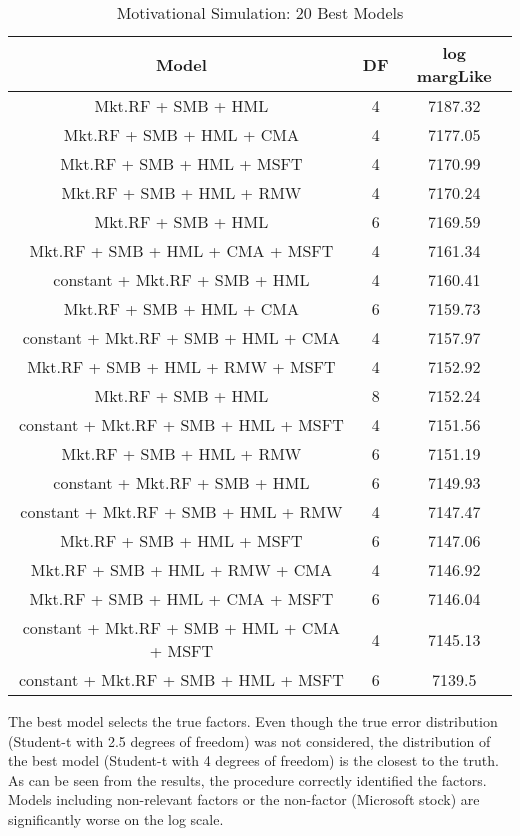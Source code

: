 \begin{table}[ht]
	
	\centering
	\footnotesize
	\begin{tabular}{ccc}
		\hline
		Model & DF & log margLike \\ 
		\hline
Mkt.RF + SMB + HML & 4 & 7187.32 \\ 
Mkt.RF + SMB + HML + CMA & 4 & 7177.05 \\ 
Mkt.RF + SMB + HML + MSFT & 4 & 7170.99 \\ 
Mkt.RF + SMB + HML + RMW & 4 & 7170.24 \\ 
Mkt.RF + SMB + HML & 6 & 7169.59 \\ 
Mkt.RF + SMB + HML + CMA + MSFT & 4 & 7161.34 \\ 
constant + Mkt.RF + SMB + HML & 4 & 7160.41 \\ 
Mkt.RF + SMB + HML + CMA & 6 & 7159.73 \\ 
constant + Mkt.RF + SMB + HML + CMA & 4 & 7157.97 \\ 
Mkt.RF + SMB + HML + RMW + MSFT & 4 & 7152.92 \\ 
Mkt.RF + SMB + HML & 8 & 7152.24 \\ 
constant + Mkt.RF + SMB + HML + MSFT & 4 & 7151.56 \\ 
Mkt.RF + SMB + HML + RMW & 6 & 7151.19 \\ 
constant + Mkt.RF + SMB + HML & 6 & 7149.93 \\ 
constant + Mkt.RF + SMB + HML + RMW & 4 & 7147.47 \\ 
Mkt.RF + SMB + HML + MSFT & 6 & 7147.06 \\ 
Mkt.RF + SMB + HML + RMW + CMA & 4 & 7146.92 \\ 
Mkt.RF + SMB + HML + CMA + MSFT & 6 & 7146.04 \\ 
constant + Mkt.RF + SMB + HML + CMA + MSFT & 4 & 7145.13 \\ 
constant + Mkt.RF + SMB + HML + MSFT & 6 & 7139.5 \\ 
		\hline
	\end{tabular}
	\caption{Motivational Simulation: 20 Best Models}
\end{table}

The best model selects the true factors. 
Even though the true error distribution (Student-t with 2.5 degrees of freedom) was not considered, the distribution of the best model (Student-t with 4 degrees of freedom) is the closest to the truth. 
As can be seen from the results, the procedure correctly identified the factors. 
Models including non-relevant factors or the non-factor (Microsoft stock) are significantly worse on the log scale.
